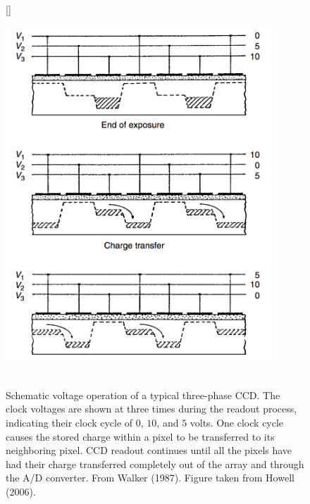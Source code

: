 \documentclass[a4paper,10pt]{article}
\begin{document}
\begin{figure}[t]
    [\FBwidth]
    {\caption{\footnotesize{\\Schematic voltage operation of a typical three-phase CCD. The clock voltages are shown at three times during the readout process, indicating their clock cycle of $0$, $10$, and $5$ volts. One clock cycle causes the stored charge within a pixel to be transferred to its neighboring pixel. CCD readout continues until all the pixels have had their charge transferred completely out of the array and through the A/D converter. From Walker (1987). Figure taken from Howell (2006).}}
    \label{fig:ccdgate}}
    {\includegraphics[width=10cm]{figures/CCDgate.png}}
\end{figure}
\end{document}
